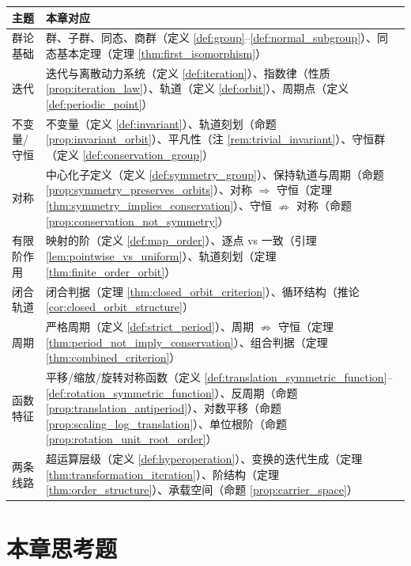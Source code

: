 \begingroup
\renewcommand{\arraystretch}{1.3}
\begin{longtable}{>{\centering\arraybackslash}p{3cm}>{\raggedright\arraybackslash}p{10.5cm}}
\toprule
\textbf{主题} & \textbf{本章对应} \\
\midrule
群论基础 & 群、子群、同态、商群（定义 \ref{def:group}--\ref{def:normal_subgroup}）、同态基本定理（定理 \ref{thm:first_isomorphism}） \\
迭代 & 迭代与离散动力系统（定义 \ref{def:iteration}）、指数律（性质 \ref{prop:iteration_law}）、轨道（定义 \ref{def:orbit}）、周期点（定义 \ref{def:periodic_point}） \\
不变量/守恒 & 不变量（定义 \ref{def:invariant}）、轨道刻划（命题 \ref{prop:invariant_orbit}）、平凡性（注 \ref{rem:trivial_invariant}）、守恒群（定义 \ref{def:conservation_group}） \\
对称 & 中心化子定义（定义 \ref{def:symmetry_group}）、保持轨道与周期（命题 \ref{prop:symmetry_preserves_orbits}）、对称 $\Rightarrow$ 守恒（定理 \ref{thm:symmetry_implies_conservation}）、守恒 $\nRightarrow$ 对称（命题 \ref{prop:conservation_not_symmetry}） \\
有限阶作用 & 映射的阶（定义 \ref{def:map_order}）、逐点 vs 一致（引理 \ref{lem:pointwise_vs_uniform}）、轨道刻划（定理 \ref{thm:finite_order_orbit}） \\
闭合轨道 & 闭合判据（定理 \ref{thm:closed_orbit_criterion}）、循环结构（推论 \ref{cor:closed_orbit_structure}） \\
周期 & 严格周期（定义 \ref{def:strict_period}）、周期 $\nRightarrow$ 守恒（定理 \ref{thm:period_not_imply_conservation}）、组合判据（定理 \ref{thm:combined_criterion}） \\
函数特征 & 平移/缩放/旋转对称函数（定义 \ref{def:translation_symmetric_function}--\ref{def:rotation_symmetric_function}）、反周期（命题 \ref{prop:translation_antiperiod}）、对数平移（命题 \ref{prop:scaling_log_translation}）、单位根阶（命题 \ref{prop:rotation_unit_root_order}） \\
两条线路 & 超运算层级（定义 \ref{def:hyperoperation}）、变换的迭代生成（定理 \ref{thm:transformation_iteration}）、阶结构（定理 \ref{thm:order_structure}）、承载空间（命题 \ref{prop:carrier_space}） \\
\bottomrule
\end{longtable}
\endgroup

\section*{本章思考题}

